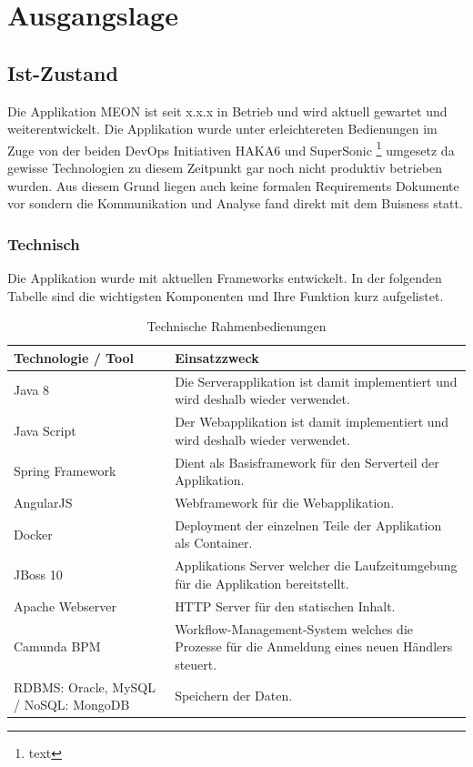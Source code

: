 \graphicspath{{./images/}}

\chapter{Ausgangslage}

\section{Ist-Zustand}

Die Applikation MEON ist seit x.x.x in Betrieb und wird aktuell gewartet und weiterentwickelt. Die Applikation wurde unter erleichtereten Bedienungen im Zuge von der beiden DevOps Initiativen HAKA6 und SuperSonic \footnote{text} umgesetz da gewisse Technologien zu diesem Zeitpunkt gar noch nicht produktiv betrieben wurden. Aus diesem Grund liegen auch keine formalen Requirements Dokumente vor sondern die Kommunikation und Analyse fand direkt mit dem Buisness statt.

\subsection{Technisch}

Die Applikation wurde mit aktuellen Frameworks entwickelt. In der folgenden Tabelle sind die wichtigsten Komponenten und Ihre Funktion kurz aufgelistet.

\begin{table}[H]
	\centering
	\caption{Technische Rahmenbedienungen}
	\begin{tabular}{ | p{4cm} | p{12cm} | }
		\toprule
		{\textbf{Technologie / Tool}} & {\textbf{Einsatzzweck}} \\
		\midrule
		Java 8 & Die Serverapplikation ist damit implementiert und wird deshalb wieder verwendet. \\ \hline
		Java Script & Der Webapplikation ist damit implementiert und wird deshalb wieder verwendet. \\ \hline
		Spring Framework & Dient als Basisframework für den Serverteil der Applikation.  \\ \hline
		AngularJS & Webframework für die Webapplikation. \\ \hline
		Docker & Deployment der einzelnen Teile der Applikation als Container. \\ \hline
		JBoss 10 & Applikations Server welcher die Laufzeitumgebung für die Applikation bereitstellt. \\ \hline
		Apache Webserver & HTTP Server für den statischen Inhalt. \\ \hline
		Camunda BPM & Workflow-Management-System welches die Prozesse für die Anmeldung eines neuen Händlers steuert. \\ \hline
		RDBMS: Oracle, MySQL / NoSQL: MongoDB & Speichern der Daten. \\ \hline
		\bottomrule
	\end{tabular}
\end{table}


